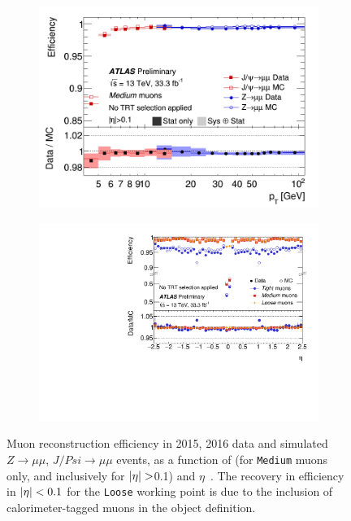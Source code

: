 \begin{figure}[h]
\begin{center}
\begin{subfigure}[b]{0.45\textwidth}
\centering
      \includegraphics[width=\textwidth]{fig/muon_reco_eff_pt.png}
     \caption{}
      \label{fig:muon_reco_eff_pt}
  \end{subfigure}
 \begin{subfigure}[b]{0.45\textwidth}
 \centering
      \includegraphics[width=\textwidth]{fig/muon_reco_eff_eta.png}
      \caption{}
      \label{fig:muon_reco_eff_eta}
  \end{subfigure}
\caption{Muon reconstruction efficiency in 2015, 2016 data and simulated $Z\rightarrow \mu\mu$,  $J/Psi\rightarrow \mu\mu$ events, as a function of \pT (for \texttt{Medium} muons only, and inclusively for 
$\abseta>$0.1) and $\eta$~\cite{Muon-combined-perf-2016}. The recovery in efficiency in $|\eta|<0.1$ for the \texttt{Loose} working point is due to the inclusion of calorimeter-tagged muons in the object definition.} 
 \label{fig:muon_reco_eff}
\end{center}
\end{figure}
